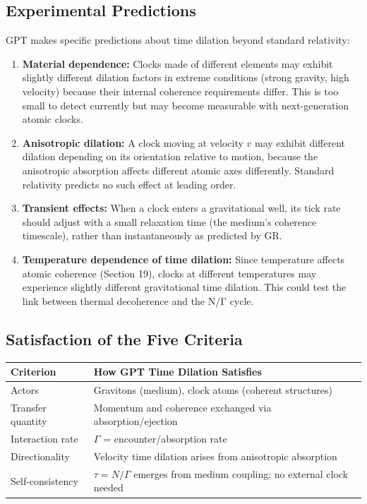 \documentclass[12pt, a4paper]{article}
\begin{document}
\subsection{Experimental Predictions}
\label{subsec:time_predictions}

GPT makes specific predictions about time dilation beyond standard relativity:

\begin{enumerate}
    \item \textbf{Material dependence:} Clocks made of different elements may exhibit slightly different dilation factors in extreme conditions (strong gravity, high velocity) because their internal coherence requirements differ. This is too small to detect currently but may become measurable with next-generation atomic clocks.
    
    \item \textbf{Anisotropic dilation:} A clock moving at velocity \( v \) may exhibit different dilation depending on its orientation relative to motion, because the anisotropic absorption affects different atomic axes differently. Standard relativity predicts no such effect at leading order.
    
    \item \textbf{Transient effects:} When a clock enters a gravitational well, its tick rate should adjust with a small relaxation time (the medium's coherence timescale), rather than instantaneously as predicted by GR.
    
    \item \textbf{Temperature dependence of time dilation:} Since temperature affects atomic coherence (Section 19), clocks at different temperatures may experience slightly different gravitational time dilation. This could test the link between thermal decoherence and the N/Γ cycle.
\end{enumerate}

\subsection{Satisfaction of the Five Criteria}
\label{subsec:time_criteria}

\begin{center}
\begin{tabular}{|p{3.5cm}|p{10cm}|}
\hline
\textbf{Criterion} & \textbf{How GPT Time Dilation Satisfies} \\
\hline
Actors & Gravitons (medium), clock atoms (coherent structures) \\
\hline
Transfer quantity & Momentum and coherence exchanged via absorption/ejection \\
\hline
Interaction rate & \( \Gamma \) = encounter/absorption rate \\
\hline
Directionality & Velocity time dilation arises from anisotropic absorption \\
\hline
Self-consistency & \( \tau = N/\Gamma \) emerges from medium coupling; no external clock needed \\
\hline
\end{tabular}
\end{center}
\end{document}
